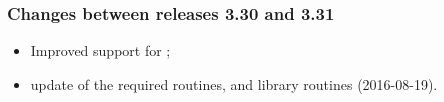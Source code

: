 \documentclass[12pt,twoside]{article}
\newcommand{\compresslist}{%
\setlength{\itemsep}{0ex}}{}
\begin{document}
{\subsubsection{Changes between releases 3.30 and 3.31}
\begin{itemize}\compresslist %
	\item Improved support for ;
	\item update of the required
    routines, and  library
    routines (2016-08-19).
\end{itemize} %
%
}
\end{document}
